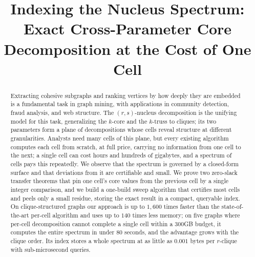 \documentclass[sigconf, anonymous, nonacm]{acmart}
\begin{document}
\title{Indexing the Nucleus Spectrum: Exact Cross-Parameter Core Decomposition at the Cost of One Cell}

\begin{abstract}
Extracting cohesive subgraphs and ranking vertices by how deeply they are embedded is a fundamental task in graph mining, with applications in community detection, fraud analysis, and web structure.
%
The $(r,s)$-nucleus decomposition is the unifying model for this task, generalizing the $k$-core and the $k$-truss to cliques; its two parameters form a plane of decompositions whose cells reveal structure at different granularities.
%
Analysts need many cells of this plane, but every existing algorithm computes each cell from scratch, at full price, carrying no information from one cell to the next; a single cell can cost hours and hundreds of gigabytes, and a spectrum of cells pays this repeatedly.
%
We observe that the spectrum is governed by a closed-form surface and that deviations from it are certifiable and small.
%
We prove two zero-slack transfer theorems that pin one cell's core values from the previous cell by a single integer comparison, and we build a one-build sweep algorithm that certifies most cells and peels only a small residue, storing the exact result in a compact, queryable index.
%
On clique-structured graphs our approach is up to $1{,}600$ times faster than the state-of-the-art per-cell algorithm and uses up to $140$ times less memory; on five graphs where per-cell decomposition cannot complete a single cell within a $300$GB budget, it computes the entire spectrum in under $80$ seconds, and the advantage grows with the clique order. Its index stores a whole spectrum at as little as $0.001$ bytes per $r$-clique with sub-microsecond queries.
\end{abstract}

\maketitle













\end{document}
